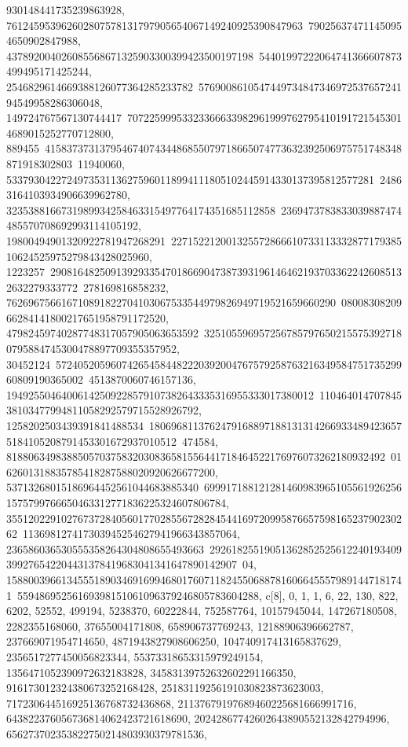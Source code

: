 {{{930148441735239863928, 761245953962602807578131797905654067149240925390847963\
790256374711450954650902847988, 437892004026085568671325903300399423500197198\
54401997222064741366607873499495171425244, 2546829614669388126077364285233782\
576900861054744973484734697253765724194549958286306048, 149724767567130744417\
707225999533233666339829619997627954101917215453014689015252770712800, 889455\
41583737313795467407434486855079718665074773632392506975751748348871918302803\
11940060, 5337930422724973531136275960118994111805102445914330137395812577281\
24863164103934906639962780, 3235388166731989934258463315497764174351685112858\
2369473783833039887474485570708692993114105192, 19800494901320922781947268291\
22715221200132557286661073311333287717938510624525975279843428025960, 1223257\
29081648250913929335470186690473873931961464621937033622426085132632279333772\
278169816858232, 762696756616710891822704103067533544979826949719521659660290\
0800830820966284141800217651958791172520, 47982459740287748317057905063653592\
3251055969572567857976502155753927180795884745300478897709355357952, 30452124\
57240520596074265458448222039200476757925876321634958475173529960809190365002\
4513870060746157136, 19492550464006142509228579107382643335316955333017380012\
11046401470784538103477994811058292579715528926792, 1258202503439391841488534\
18069681137624791688971881313142669334894236575184105208791453301672937010512\
474584, 818806349838850570375832030836581556441718464522176976073262180932492\
0162601318835785418287588020920626677200, 53713268015186964452561044683885340\
6999171881212814609839651055619262561575799766650463312771836225324607806784, 
   35512022910276737284056017702855672828454416972099587665759816523790230262\
113698127417303945254627941966343857064, 236586036530555358264304808655493663\
29261825519051362852525612240193409399276542204431378419683041341647890142907\
04, 1588003966134555189034691699468017607118245506887816066455579891447181741\
55948695256169398151061096379246805783604288}}, 
 {c[8], {0, 1, 1, 6, 22, 130, 822, 6202, 52552, 499194, 5238370, 60222844, 
   752587764, 10157945044, 147267180508, 2282355168060, 37655004171808, 
   658906737769243, 12188906396662787, 237669071954714650, 
   4871943827908606250, 104740917413165837629, 2356517277450056823344, 
   55373318653315979249154, 1356471052390972632183828, 
   34583139752632602291166350, 916173012324380673252168428, 
   25183119256191030823873623003, 717230644516925136768732436868, 
   21137679197689460225681666991716, 643822376056736814062423721618690, 
   20242867742602643890552132842794996, 656273702353822750214803930379781536, 
}}}

